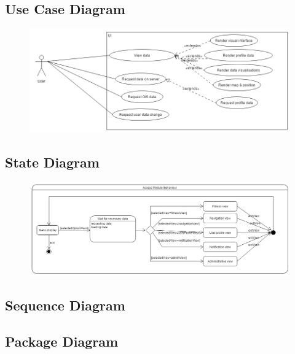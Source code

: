 \subsection{Use Case Diagram}
\begin{figure}[!h]
	\includegraphics[width=\textwidth]{Access_Modules/AUCD_v2.png}
\end{figure}

\subsection{State Diagram}
\begin{figure}[!h]
	\includegraphics[width=\textwidth]{Access_Modules/AccessStateDiagram.png}
\end{figure}

\subsection{Sequence Diagram}

\subsection{Package Diagram}

